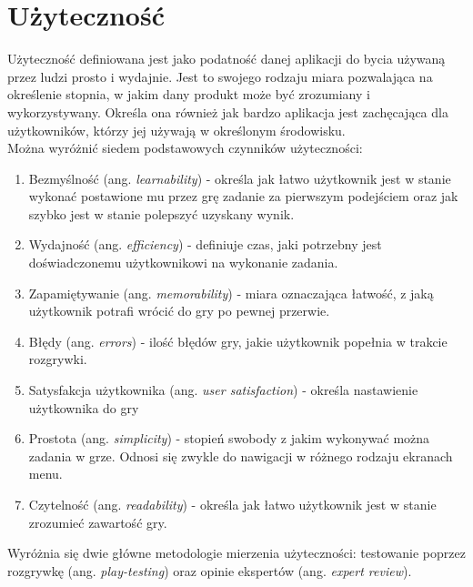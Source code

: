 \documentclass[a4paper,12pt,numbers=noenddot]{report}
\begin{document}
\section{Użyteczność}
Użyteczność definiowana jest jako podatność danej aplikacji do bycia używaną przez ludzi prosto i wydajnie\cite{art_Usability}. Jest to swojego rodzaju miara pozwalająca na określenie stopnia, w jakim dany produkt może być zrozumiany i wykorzystywany. Określa ona również jak bardzo aplikacja jest zachęcająca dla użytkowników, którzy jej używają w określonym środowisku. \cite{art_evaluationOfMGevaluationSystem} 
\\
Można wyróżnić siedem podstawowych czynników użyteczności: \cite{art_UsabilityEvaluationSystematicReview}
\begin{enumerate}
\item Bezmyślność (ang. \textit{learnability}) - określa jak łatwo użytkownik jest w stanie wykonać postawione mu przez grę zadanie za pierwszym podejściem oraz jak szybko jest w stanie polepszyć uzyskany wynik.
\item Wydajność (ang. \textit{efficiency}) - definiuje czas, jaki potrzebny jest doświadczonemu użytkownikowi na wykonanie zadania.
\item Zapamiętywanie (ang. \textit{memorability}) - miara oznaczająca łatwość, z jaką użytkownik potrafi wrócić do gry po pewnej przerwie.
\item Błędy (ang. \textit{errors}) - ilość błędów gry, jakie użytkownik popełnia w trakcie rozgrywki.
\item Satysfakcja użytkownika (ang. \textit{user satisfaction}) - określa nastawienie użytkownika do gry
\item Prostota (ang. \textit{simplicity}) - stopień swobody z jakim wykonywać można zadania w grze. Odnosi się zwykle do nawigacji w różnego rodzaju ekranach menu.
\item Czytelność (ang. \textit{readability}) - określa jak łatwo użytkownik jest w stanie zrozumieć zawartość gry.
\end{enumerate}

Wyróżnia się dwie główne metodologie mierzenia użyteczności: testowanie poprzez rozgrywkę (ang. \textit{play-testing}) oraz opinie ekspertów (ang. \textit{expert review}).
\end{document}

